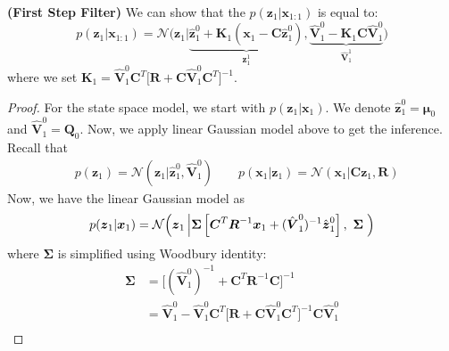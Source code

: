 \begin{proposition}{\textbf{(First Step Filter)}}
    We can show that the $p(\boldsymbol z_1 | \boldsymbol x_{1:1})$ is equal to:
    \begin{equation*}
        p(\boldsymbol z_1 | \boldsymbol x_{1:1}) = \mathcal{N}\Big(\boldsymbol z_1 \Big | \underbrace{\hat{\boldsymbol z}^0_1 + \boldsymbol K_1 (\boldsymbol x_1 - \boldsymbol C\hat{\boldsymbol z}^0_1)}_{\boldsymbol z^1_1}, \underbrace{\hat{\boldsymbol V}^0_1 - \boldsymbol K_1\boldsymbol C\hat{\boldsymbol V}^0_1}_{\hat{\boldsymbol V}^1_1} \Big)
    \end{equation*}
    where we set $\boldsymbol K_1 = \hat{\boldsymbol V}^0_1\boldsymbol C^T\Big[\boldsymbol R + \boldsymbol C\hat{\boldsymbol V}^0_1 \boldsymbol C^T\Big]^{-1} $. 
\end{proposition}
\begin{proof}
    For the state space model, we start with $p(\boldsymbol z_1 | \boldsymbol x_1)$. We denote $\hat{\boldsymbol z}^0_1 = \boldsymbol \mu_0$ and $\hat{\boldsymbol V}^0_1 = \boldsymbol Q_0$. Now, we apply linear Gaussian model above to get the inference. Recall that
    \begin{equation*}
    \begin{aligned}
        &p(\boldsymbol z_1) = \mathcal{N}(\boldsymbol z_1 | \hat{\boldsymbol z}^0_1, \hat{\boldsymbol V}^0_1) \qquad 
        p(\boldsymbol x_1|\boldsymbol z_1) = \mathcal{N}(\boldsymbol x_1 | \boldsymbol C\boldsymbol z_1, \boldsymbol R)
    \end{aligned}
    \end{equation*}
    Now, we have the linear Gaussian model as 
    \begin{equation*}
        p(\boldsymbol z_1 | \boldsymbol x_1) = \mathcal{N}\Big( \boldsymbol z_1 \left| \boldsymbol \Sigma\left[  \boldsymbol C^T\boldsymbol R^{-1}\boldsymbol x_1 + (\hat{\boldsymbol V}^0_1)^{-1}\hat{\boldsymbol z}^0_1  \right], \ \boldsymbol \Sigma\right. \Big)
    \end{equation*}
    where $\boldsymbol \Sigma$ is simplified using Woodbury identity:
    \begin{equation*}
    \begin{aligned}
        \boldsymbol \Sigma &= \Big[ (\hat{\boldsymbol V}^0_1)^{-1} + \boldsymbol C^T\boldsymbol R^{-1}\boldsymbol C \Big]^{-1} \\
        &= \hat{\boldsymbol V}^0_1 - \hat{\boldsymbol V}^0_1\boldsymbol C^T\Big[\boldsymbol R + \boldsymbol C\hat{\boldsymbol V}^0_1 \boldsymbol C^T\Big]^{-1}\boldsymbol C\hat{\boldsymbol V}^0_1 \\

\end{aligned}
\end{equation*}
\end{proof}
